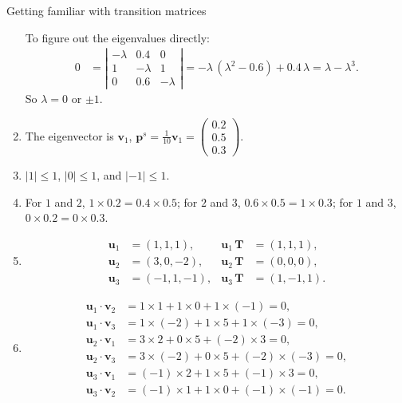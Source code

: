 \documentclass[12pt]{article}
\begin{document}
\begin{problem}{Getting familiar with transition matrices}
\begin{enumerate}
    To figure out the eigenvalues directly:
    $$
    \begin{aligned}
    0
    &=
    \left|
      \begin{array}{ccc}
      -\lambda  &   0.4   &   0  \\
      1         & -\lambda  &   1  \\
      0         &   0.6   &   -\lambda
      \end{array}
    \right|
    =
    -\lambda \, (\lambda^2 - 0.6) + 0.4 \, \lambda
    =
    \lambda - \lambda^3
    .
    \end{aligned}
    $$
    So $\lambda = 0$ or $\pm 1$.

  \item
    The eigenvector is $\mathbf v_1$,
    $
      \mathbf p^s
      =
      \frac{1}{10} \mathbf v_1
      =
      \left(
        \begin{array}{r}
          0.2 \\
          0.5 \\
          0.3
        \end{array}
      \right)
      .
    $

  \item
    $|1| \le 1$, $|0| \le 1$, and $|-1| \le 1$.

  \item
    For $1$ and $2$, $1 \times 0.2 = 0.4 \times 0.5$;
    for $2$ and $3$, $0.6 \times 0.5 = 1 \times 0.3$;
    for $1$ and $3$, $0 \times 0.2 = 0 \times 0.3$.

  \item
    $$
    \begin{aligned}
      \mathbf u_1 &= (1, 1, 1),
      &
      \mathbf u_1 \, \mathbf T &= (1, 1, 1)
      , \\
      \mathbf u_2 &= (3, 0, -2),
      &
      \mathbf u_2 \, \mathbf T &= (0, 0, 0)
      , \\
      \mathbf u_3 &= (-1, 1, -1),
      &
      \mathbf u_3 \, \mathbf T &= (1, -1, 1)
      .
    \end{aligned}
    $$

  \item
    $$
    \begin{aligned}
      \mathbf u_1 \cdot \mathbf v_2 &= 1    \times 1    + 1 \times 0 +    1 \times (-1) = 0, \\
      \mathbf u_1 \cdot \mathbf v_3 &= 1    \times (-2) + 1 \times 5 +    1 \times (-3) = 0, \\
      \mathbf u_2 \cdot \mathbf v_1 &= 3    \times 2    + 0 \times 5 + (-2) \times 3    = 0, \\
      \mathbf u_2 \cdot \mathbf v_3 &= 3    \times (-2) + 0 \times 5 + (-2) \times (-3) = 0, \\
      \mathbf u_3 \cdot \mathbf v_1 &= (-1) \times 2    + 1 \times 5 + (-1) \times 3    = 0, \\
      \mathbf u_3 \cdot \mathbf v_2 &= (-1) \times 1    + 1 \times 0 + (-1) \times (-1) = 0.
    \end{aligned}
    $$


\end{enumerate}
\end{problem}
\end{document}

